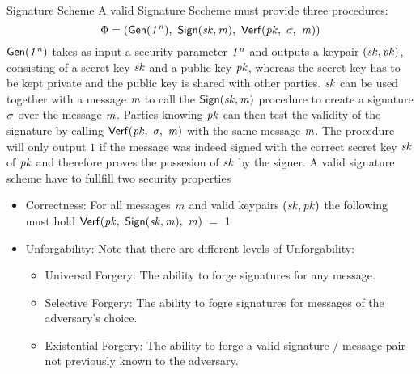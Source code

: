 \begin{definition}{Signature Scheme}\label{def:signatureScheme}
    A valid Signature Sccheme must provide three procedures:
    \[ \Phi = (\mathsf{\mathsf{Gen}}(\mathit{1^n}) ,~ \mathsf{Sign}(\mathit{sk}, \mathit{m}) ,~ \mathsf{Verf}(\mathit{pk} ,~ \sigma ,~ \mathit{m})) \]
    $\mathsf{\mathsf{Gen}}(\mathit{1^n})$ takes as input a security parameter $\mathit{1^n}$ and outputs a keypair $(\mathit{sk}, \mathit{pk})$, consisting of a secret key $\mathit{sk}$ and a public key $\mathit{pk}$, whereas
    the secret key has to be kept private and the public key is shared with other parties.
    $\mathit{sk}$ can be used together with a message $\mathit{m}$ to call the $\mathsf{Sign}(\mathit{sk}, \mathit{m})$ procedure to create a signature $\sigma$ over the message $\mathit{m}$.
    Parties knowing $\mathit{pk}$ can then test the validity of the signature by calling $\mathsf{Verf}(\mathit{pk} ,~ \sigma ,~ \mathit{m})$ with the same message $\mathit{m}$. The procedure will only output $1$ if the message was
    indeed signed with the correct secret key $\mathit{sk}$ of $\mathit{pk}$ and therefore proves the possesion of $\mathit{sk}$ by the signer.
    A valid signature scheme have to fullfill two security properties
    \begin{itemize}
        \item Correctness: For all messages $\mathit{m}$ and valid keypairs $(\mathit{sk}, \mathit{pk})$ the following must hold $\mathsf{Verf}(\mathit{pk} ,~ \mathsf{Sign}(\mathit{sk}, \mathit{m}) ,~ \mathit{m}) ~=~ 1$
        \item Unforgability: Note that there are different levels of Unforgability:~\cite{goldwasser1988digital}
        \begin{itemize}
            \item Universal Forgery: The ability to forge signatures for any message.
            \item Selective Forgery: The ability to fogre signatures for messages of the adversary's choice.
            \item Existential Forgery: The ability to forge a valid signature / message pair not previously known to the adversary.
        \end{itemize}
    \end{itemize}
\end{definition}

